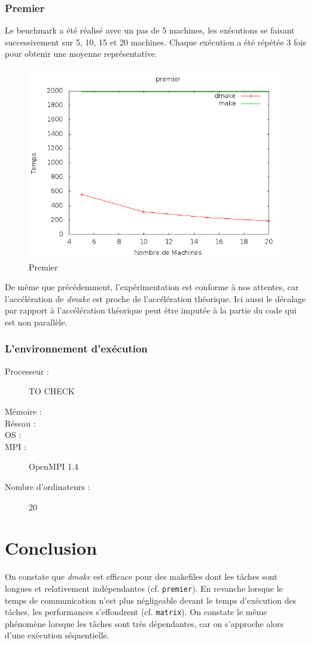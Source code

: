 \documentclass[a4paper,12pt,twoside]{article}
\begin{document}
\subsubsection{Premier}

Le benchmark a été réalisé avec un pas de 5 machines, les exécutions
se faisant successivement sur 5, 10, 15 et 20 machines. Chaque
exécution a été répétée 3 fois pour obtenir une moyenne
représentative.

\begin{figure}[H]
  \centering
  \includegraphics[scale=0.5]{benchmark_premier_01.png}
  \caption{Premier}
  \label{fig:premier}
\end{figure}

De même que précédemment, l'expérimentation est conforme à nos attentes, car
l'accélération de \emph{dmake} est proche de l'accélération
théorique. Ici aussi le décalage par rapport à l'accélération théorique peut
être imputée à la partie du code qui est non parallèle. 

\subsubsection{L'environnement d'exécution}
\begin{description}
\item[Processeur :] TO CHECK
\item[Mémoire :]
\item[Réseau :]
\item[OS :]
\item[MPI :] OpenMPI 1.4
\item[Nombre d’ordinateurs :] 20
\end{description}

\section*{Conclusion}
On constate que \emph{dmake} est efficace pour des makefiles dont les
tâches sont longues et relativement indépendantes
(cf. \texttt{premier}). En revanche lorsque le temps de communication
n'est plus négligeable devant le temps d'exécution des tâches, les
performances s'effondrent (cf. \texttt{matrix}). On constate le même phénomène lorsque les
tâches sont très dépendantes, car on s'approche alors d'une exécution séquentielle.
\end{document}
